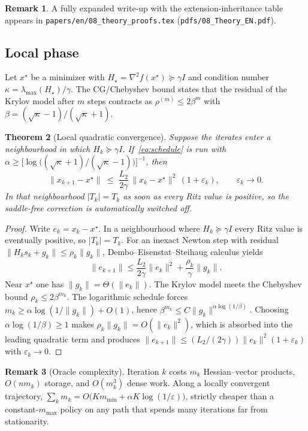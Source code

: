\documentclass[11pt,a4paper]{article}
\newtheorem{theorem}{Theorem}
\theoremstyle{definition}
\newtheorem{remark}[theorem]{Remark}
\begin{document}
\begin{remark}
A fully expanded write-up with the extension-inheritance table appears in
\texttt{papers/en/08\_theory\_proofs.tex} (\texttt{pdfs/08\_Theory\_EN.pdf}).
\end{remark}

\subsection{Local phase}
Let $x^\star$ be a minimizer with $H_\star=\nabla^2 f(x^\star)\succeq\gamma I$
and condition number $\kappa=\lambda_{\max}(H_\star)/\gamma$.
The CG/Chebyshev bound \cite{saad2003,jiang2024} states that the residual of
the Krylov model after $m$ steps contracts as
$\rho^{(m)}\le 2\beta^m$ with
$\beta=(\sqrt{\kappa}-1)/(\sqrt{\kappa}+1)$.

\begin{theorem}[Local quadratic convergence]\label{thm:local}
Suppose the iterates enter a neighbourhood in which $H_k\succeq\gamma I$.
If~\eqref{eq:schedule} is run with
$\alpha\ge\bigl[\log\bigl((\sqrt{\kappa}+1)/(\sqrt{\kappa}-1)\bigr)\bigr]^{-1}$,
then
\[
\|x_{k+1}-x^\star\|
\;\le\;
\frac{L_2}{2\gamma}\,\|x_k-x^\star\|^2\,(1+\varepsilon_k),
\qquad\varepsilon_k\to 0.
\]
In that neighbourhood $|T_k|=T_k$ as soon as every Ritz value is positive,
so the saddle-free correction is automatically switched off.
\end{theorem}

\begin{proof}
Write $e_k=x_k-x^\star$. In a neighbourhood where $H_k\succeq\gamma I$ every
Ritz value is eventually positive, so $|T_k|=T_k$. For an inexact Newton
step with residual $\|H_k s_k+g_k\|\le\rho_k\|g_k\|$,
Dembo--Eisenstat--Steihaug calculus \cite{dembo1982} yields
\[
\|e_{k+1}\|
\le
\frac{L_2}{2\gamma}\|e_k\|^2+\frac{\rho_k}{\gamma}\|g_k\|.
\]
Near $x^\star$ one has $\|g_k\|=\Theta(\|e_k\|)$. The Krylov model meets the
Chebyshev bound $\rho_k\le 2\beta^{m_k}$. The logarithmic schedule forces
$m_k\ge\alpha\log(1/\|g_k\|)+O(1)$, hence
$\beta^{m_k}\le C\|g_k\|^{\alpha\log(1/\beta)}$.
Choosing $\alpha\log(1/\beta)\ge 1$ makes $\rho_k\|g_k\|=O(\|e_k\|^2)$, which
is absorbed into the leading quadratic term and produces
$\|e_{k+1}\|\le (L_2/(2\gamma))\|e_k\|^2(1+\varepsilon_k)$ with
$\varepsilon_k\to 0$.
\end{proof}

\begin{remark}[Oracle complexity]
Iteration $k$ costs $m_k$ Hessian--vector products, $O(n m_k)$ storage, and
$O(m_k^3)$ dense work. Along a locally convergent trajectory,
$\sum_k m_k = O\bigl(K m_{\min}+\alpha K\log(1/\varepsilon)\bigr)$,
strictly cheaper than a constant-$m_{\max}$ policy on any path that spends
many iterations far from stationarity.
\end{remark}
\end{document}
